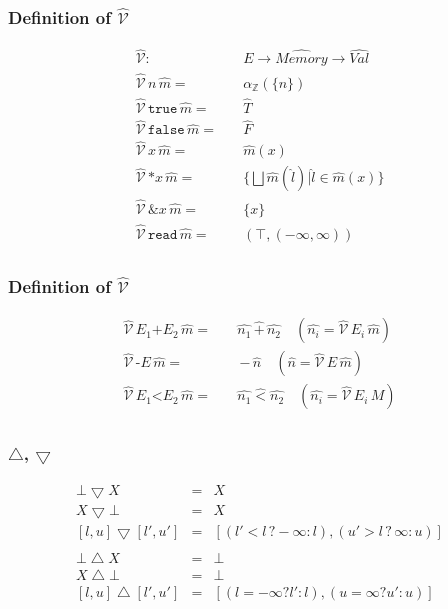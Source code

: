 \documentclass{beamer}
\begin{document}
\begin{frame}
    \frametitle{Definition of $\hat{\mathcal{V}}$ }
    \begin{align*}
        \hat{\mathcal{V}} : & \quad E \to \hat{Memory} \to \hat{Val} \\
        \hat{\mathcal{V}} \, n                      \, \hat{m} = & \quad \alpha_{\mathbb{Z}} (\{n\}) \\
        \hat{\mathcal{V}} \, \texttt{true}          \, \hat{m} = & \quad \hat{T} \\
        \hat{\mathcal{V}} \, \texttt{false}     \, \hat{m} = & \quad \hat{F} \\
        \hat{\mathcal{V}} \, x                  \, \hat{m} = & \quad \hat{m}(x) \\
        \hat{\mathcal{V}} \, \texttt{*}x            \, \hat{m} = & \quad \{ \bigsqcup \hat{m}(\hat{l}) | \hat{l} \in \hat{m}(x) \} \\
        \hat{\mathcal{V}} \, \texttt{\&}x           \, \hat{m} = & \quad \{x\} \\
        \hat{\mathcal{V}} \, \texttt{read}      \, \hat{m} = & \quad (\top, (-\infty, \infty)) \\
    \end{align*}
\end{frame}

\begin{frame}
    \frametitle{Definition of $\hat{\mathcal{V}}$ }
    \begin{align*}
        \hat{\mathcal{V}} \, E_1 \texttt{+} E_2     \, \hat{m} = & \quad \hat{n_1} \, \hat{+} \, \hat{n_2}
                                                        \quad (\hat{n_i} = \hat{\mathcal{V}} \, E_i \, \hat{m}) \\
        \hat{\mathcal{V}} \, \texttt{-} E           \, \hat{m} = & \quad \, \hat{-} \, \hat{n} \quad (\hat{n} = \hat{\mathcal{V}} \, E \, \hat{m}) \\
        \hat{\mathcal{V}} \, E_1 \texttt{<} E_2     \, \hat{m} = & \quad \hat{n_1} \hat{<} \hat{n_2}
                                                        \quad (\hat{n_i} = \hat{\mathcal{V}} \, E_i \, M) \\
    \end{align*}
\end{frame}

\begin{frame}
    \frametitle{$\bigtriangleup$, $\bigtriangledown$}
    \begin{align*}
        \bot \bigtriangledown X & = & X \\
        X \bigtriangledown \bot & = & X \\
        [l, u] \bigtriangledown [l', u'] & = & [(l' < l \, ? - \infty : l), (u' > l \, ? \, \infty : u)] \\
        \\
        \bot \bigtriangleup X & = & \bot \\
        X \bigtriangleup \bot & = & \bot \\
        [l, u] \bigtriangleup [l', u'] & = & [(l = - \infty ? l' : l), (u = \infty ? u' : u)]
    \end{align*}
\end{frame}
\end{document}
